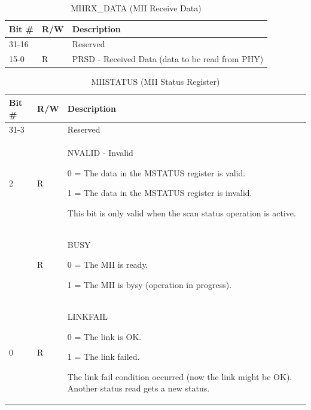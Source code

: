 \begin{xltabular}{\textwidth}{|l|l|X|}
  
  \hline
  {\bf Bit \#} & {\bf R/W} & {\bf Description} \\ \hline \hline
  \endfirsthead
  \hline
  \caption{MIIRX\_DATA (MII Receive Data)}
  \endlastfoot

  31-16   &   & Reserved \\* \nobreakhline
  15-0    & R &  PRSD - Received Data (data to be read from PHY) \\
\end{xltabular}
\label{csr_details:miirx_data}

\begin{xltabular}{\textwidth}{|l|l|X|}
  
  \hline
  {\bf Bit \#} & {\bf R/W} & {\bf Description} \\ \hline \hline
  \endfirsthead
  \hline
  \caption{MIISTATUS (MII Status Register)}
  \endlastfoot

  31-3   &   & Reserved \\* \nobreakhline
  2      & R & NVALID - Invalid

              0 = The data in the MSTATUS register is valid.

              1 = The data in the MSTATUS register is invalid. 

              This bit is only valid when the scan status operation is
              active.\\*       & R & BUSY

              0 = The MII is ready.

              1 = The MII is bysy (operation in progress). \\* \nobreakhline
  0      & R & LINKFAIL

              0 = The link is OK.

              1 = The link failed. 

              The link fail condition occurred (now the link might be OK).
              Another status read gets a new status.\\ \hline
\end{xltabular}
\label{csr_details:miistatus}

